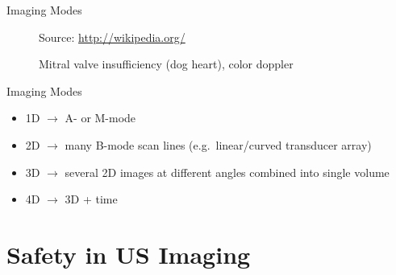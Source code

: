 \begin{frame}{Imaging Modes \cont}

    \begin{figure}
        \begin{center}

            \caption{Mitral valve insufficiency (dog heart), color doppler}
            \begin{flushright}
                \tiny Source: \url{http://wikipedia.org/}
            \end{flushright}
        \end{center}
    \end{figure}
\end{frame}


\begin{frame}{Imaging Modes \cont}

    \begin{itemize}
        \setlength\itemsep{0.1cm}
        \item 1D $\rightarrow$ A- or M-mode
        \item 2D $\rightarrow$ many B-mode scan lines (e.g.~linear/curved transducer array)
        \item 3D $\rightarrow$ several 2D images at different angles combined into single volume
        \item 4D $\rightarrow$ 3D + time
    \end{itemize}

\end{frame}


\section{Safety in US Imaging}


